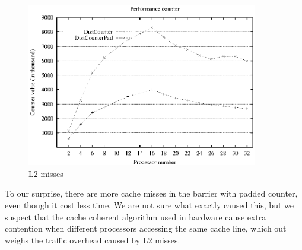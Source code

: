 \begin{figure}[!h]
  \begin{center}
    \includegraphics[angle=0, width=0.9\textwidth]{lsource.eps}
    \caption{L2 misses}
    \label{fig:lsource}
    \end{center}
\end{figure}

To our surprise, there are more cache misses in the barrier with
padded counter, even though it cost less time. We are not sure what
exactly caused this, but we suspect that the cache coherent algorithm
used in hardware cause extra contention when different processors
accessing the same cache line, which out weighs the traffic overhead
caused by L2 misses.




